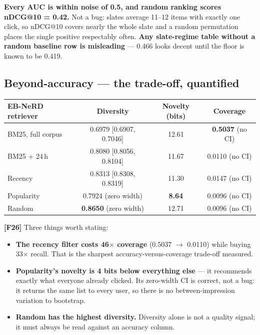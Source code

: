 \documentclass[11pt,a4paper]{article}
\newcommand{\finding}[1]{\textcolor{blue!55!black}{\textbf{[#1]}}}
\begin{document}
\textbf{Every AUC is within noise of 0.5, and random ranking scores nDCG@10 = 0.42.} Not a bug:
slates average 11--12 items with exactly one click, so nDCG@10 covers nearly the whole slate and a
random permutation places the single positive respectably often. \textbf{Any slate-regime table
without a random baseline row is misleading} --- 0.466 looks decent until the floor is known to be
0.419.

\subsection{Beyond-accuracy --- the trade-off, quantified}\label{sec:beyond}

\begin{center}\small
\begin{tabular}{lccc}
\toprule
EB-NeRD retriever & Diversity & Novelty (bits) & Coverage \\
\midrule
BM25, full corpus & 0.6979 [0.6907, 0.7046] & 12.61 & \textbf{0.5037} (no CI) \\
BM25 + 24\,h      & 0.8080 [0.8056, 0.8104] & 11.67 & 0.0110 (no CI) \\
Recency           & 0.8313 [0.8308, 0.8319] & 11.30 & 0.0147 (no CI) \\
Popularity        & 0.7924 (zero width)     & \textbf{8.64} & 0.0096 (no CI) \\
Random            & \textbf{0.8650} (zero width) & 12.71 & 0.0096 (no CI) \\
\bottomrule
\end{tabular}
\end{center}

\finding{F26} Three things worth stating:
\begin{itemize}[leftmargin=1.4em,itemsep=2pt]
  \item \textbf{The recency filter costs 46$\times$ coverage} (0.5037 $\rightarrow$ 0.0110) while
        buying 33$\times$ recall. That is the sharpest accuracy-versus-coverage trade-off measured.
  \item \textbf{Popularity's novelty is 4 bits below everything else} --- it recommends exactly
        what everyone already clicked. Its zero-width CI is correct, not a bug: it returns the same
        list to every user, so there is no between-impression variation to bootstrap.
  \item \textbf{Random has the highest diversity.} Diversity alone is not a quality signal; it must
        always be read against an accuracy column.
\end{itemize}
\end{document}

